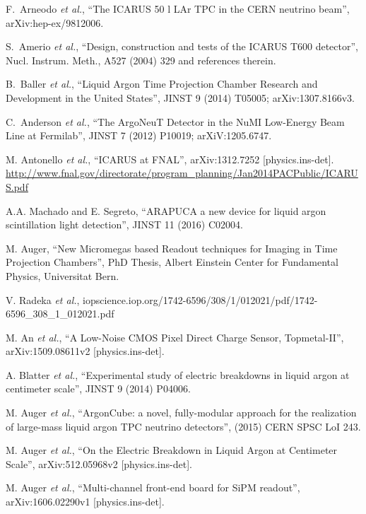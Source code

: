 \begin{thebibliography}{99}
F.~Arneodo {\it et al.},
``The ICARUS 50 l LAr TPC in the CERN neutrino beam'', 
arXiv:hep-ex/9812006.

S.~Amerio {\it et al.},
``Design, construction and tests of the ICARUS T600 detector'',
Nucl. Instrum. Meth., A527 (2004) 329  and references therein.

B.~Baller {\it et al.},
``Liquid Argon Time Projection Chamber Research and Development in the United States'', JINST 9 (2014) T05005;  arXiv:1307.8166v3.

C.~Anderson {\it et al.},
``The ArgoNeuT Detector in the NuMI Low-Energy Beam Line at Fermilab'', JINST 7 (2012) P10019;
arXiV:1205.6747.

M. Antonello {\it et al.}, ``ICARUS at FNAL'', arXiv:1312.7252 [physics.ins-det].
\url{http://www.fnal.gov/directorate/program\_planning/Jan2014PACPublic/ICARUS.pdf}

A.A. Machado and E. Segreto, ``ARAPUCA a new device for liquid argon scintillation light detection'', JINST 11 (2016) C02004.

M. Auger, ``New Micromegas based Readout techniques for Imaging in Time Projection Chambers'', PhD Thesis, Albert Einstein Center for Fundamental Physics, Universitat Bern.

V. Radeka {\it et al.}, iopscience.iop.org/1742-6596/308/1/012021/pdf/1742-6596\_308\_1\_012021.pdf

M. An {\it et al.}, ``A Low-Noise CMOS Pixel Direct Charge Sensor, Topmetal-II'', arXiv:1509.08611v2 [physics.ins-det].

A. Blatter {\it et al.}, ``Experimental study of electric breakdowns in liquid argon at centimeter scale'', JINST 9 (2014) P04006.%

M. Auger {\it et al.}, ``ArgonCube: a novel, fully-modular approach for the realization of large-mass liquid argon TPC neutrino detectors'', (2015) CERN SPSC LoI 243.

M. Auger {\it et al.}, ``On the Electric Breakdown in Liquid Argon at Centimeter Scale'', arXiv:512.05968v2 [physics.ins-det].

M. Auger {\it et al.}, ``Multi-channel front-end board for SiPM readout'', arXiv:1606.02290v1 [physics.ins-det].


\end{thebibliography}
